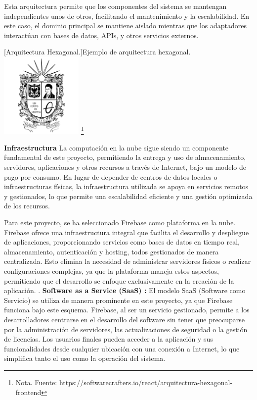 {\begin{itemize}
    Esta arquitectura permite que los componentes del sistema se mantengan independientes unos de otros, facilitando el mantenimiento y la escalabilidad. En este caso, el dominio principal se mantiene aislado mientras que los adaptadores interactúan con bases de datos, APIs, y otros servicios externos.
    
    \vspace{2mm}
    \begin{minipage}{0.9\textwidth}
        \centering
        [{Arquitectura Hexagonal.}]{Ejemplo de arquitectura hexagonal.}
        \label{hexagonal}
        \includegraphics[width=0.3\textwidth]{Content/Images/Escudo_UD.png}
        \footnote{Nota. \textup{Fuente: https://softwarecrafters.io/react/arquitectura-hexagonal-frontend}}
    \end{minipage}

    
\end{itemize}

\textbf{Infraestructura }
\newline
La computación en la nube sigue siendo un componente fundamental de este proyecto, permitiendo la entrega y uso de almacenamiento, servidores, aplicaciones y otros recursos a través de Internet, bajo un modelo de pago por consumo. En lugar de depender de centros de datos locales o infraestructuras físicas, la infraestructura utilizada se apoya en servicios remotos y gestionados, lo que permite una escalabilidad eficiente y una gestión optimizada de los recursos.

Para este proyecto, se ha seleccionado Firebase como plataforma en la nube. Firebase ofrece una infraestructura integral que facilita el desarrollo y despliegue de aplicaciones, proporcionando servicios como bases de datos en tiempo real, almacenamiento, autenticación y hosting, todos gestionados de manera centralizada. Esto elimina la necesidad de administrar servidores físicos o realizar configuraciones complejas, ya que la plataforma maneja estos aspectos, permitiendo que el desarrollo se enfoque exclusivamente en la creación de la aplicación. \cite{FirebaseCloud}.
\newline
\textbf{Software as a Service (SaaS) :}
El modelo SaaS (Software como Servicio) se utiliza de manera prominente en este proyecto, ya que Firebase funciona bajo este esquema. Firebase, al ser un servicio gestionado, permite a los desarrolladores centrarse en el desarrollo del software sin tener que preocuparse por la administración de servidores, las actualizaciones de seguridad o la gestión de licencias. Los usuarios finales pueden acceder a la aplicación y sus funcionalidades desde cualquier ubicación con una conexión a Internet, lo que simplifica tanto el uso como la operación del sistema. \cite{FirebaseSAAS}


}
